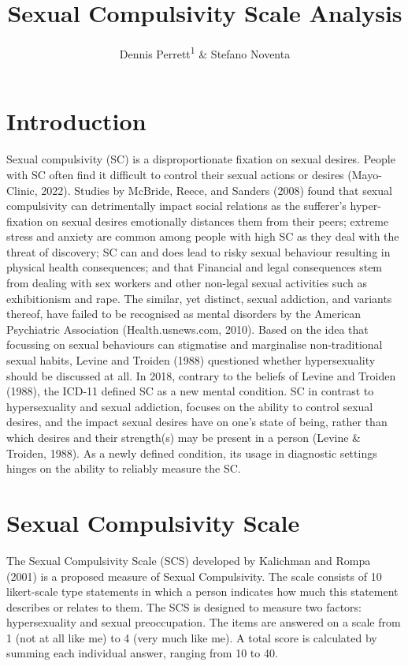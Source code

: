 \documentclass[
  man,floatsintext]{apa6}
\title{Sexual Compulsivity Scale Analysis}
\author{Dennis Perrett\textsuperscript{1} \& Stefano Noventa\textsuperscript{}}
\date{}
\affiliation{\vspace{0.5cm}\textsuperscript{1} University of Tübingen}
\begin{document}
\maketitle

\justifying

\hypertarget{introduction}{%
\section{Introduction}\label{introduction}}

Sexual compulsivity (SC) is a disproportionate fixation on sexual desires. People with SC often find it difficult to control their sexual actions or desires (Mayo-Clinic, 2022). Studies by McBride, Reece, and Sanders (2008) found that sexual compulsivity can detrimentally impact social relations as the sufferer's hyper-fixation on sexual desires emotionally distances them from their peers; extreme stress and anxiety are common among people with high SC as they deal with the threat of discovery; SC can and does lead to risky sexual behaviour resulting in physical health consequences; and that Financial and legal consequences stem from dealing with sex workers and other non-legal sexual activities such as exhibitionism and rape. The similar, yet distinct, sexual addiction, and variants thereof, have failed to be recognised as mental disorders by the American Psychiatric Association (Health.usnews.com, 2010). Based on the idea that focussing on sexual behaviours can stigmatise and marginalise non-traditional sexual habits, Levine and Troiden (1988) questioned whether hypersexuality should be discussed at all. In 2018, contrary to the beliefs of Levine and Troiden (1988), the ICD-11 defined SC as a new mental condition. SC in contrast to hypersexuality and sexual addiction, focuses on the ability to control sexual desires, and the impact sexual desires have on one's state of being, rather than which desires and their strength(s) may be present in a person (Levine \& Troiden, 1988). As a newly defined condition, its usage in diagnostic settings hinges on the ability to reliably measure the SC.

\hypertarget{sexual-compulsivity-scale}{%
\section{Sexual Compulsivity Scale}\label{sexual-compulsivity-scale}}

The Sexual Compulsivity Scale (SCS) developed by Kalichman and Rompa (2001) is a proposed measure of Sexual Compulsivity. The scale consists of 10 likert-scale type statements in which a person indicates how much this statement describes or relates to them. The SCS is designed to measure two factors: hypersexuality and sexual preoccupation. The items are answered on a scale from 1 (not at all like me) to 4 (very much like me). A total score is calculated by summing each individual answer, ranging from 10 to 40.
\end{document}
